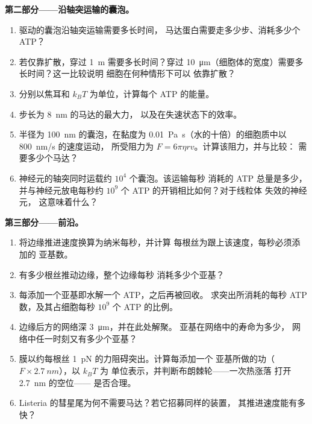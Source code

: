 \begin{problem}
\medskip
\noindent\textbf{第二部分——沿轴突运输的囊泡。}
\begin{enumerate}[resume]
  \item {}驱动的囊泡沿轴突运输需要多长时间，
        马达蛋白需要走多少步、消耗多少个 ATP？
  \item 若仅靠扩散，穿过 \qty{1}{m} 需要多长时间？穿过
        \qty{10}{\micro m}（细胞体的宽度）需要多长时间？这一比较说明
        细胞在何种情形下可以
        依靠扩散？
  \item 分别以焦耳和 $k_{B}T$ 为单位，计算每个 ATP 的能量。
  \item 步长为 \qty{8}{nm} 的马达的最大力，
        以及在失速状态下的效率。
  \item 半径为 \qty{100}{nm} 的囊泡，在黏度为
        \qty{0.01}{Pa.s}（水的十倍）的细胞质中以 \qty{800}{nm/s} 的速度运动，
        所受阻力为 $F = 6\pi\eta r v$。计算该阻力，并与比较：
        需要多少个马达？
  \item 神经元的轴突同时运载约 $10^{4}$ 个囊泡。该运输每秒
        消耗的 ATP 总量是多少，并与神经元放电每秒约
        $10^{9}$ 个 ATP 的开销相比如何？对于线粒体
        失效的神经元，
        这意味着什么？
\end{enumerate}

\medskip
\noindent\textbf{第三部分——前沿。}
\begin{enumerate}[resume]
  \item 将边缘推进速度换算为纳米每秒，并计算
        每根丝为跟上该速度，每秒必须添加的
        亚基数。
  \item 有多少根丝推动边缘，整个边缘每秒
        消耗多少个亚基？
  \item 每添加一个亚基即水解一个 ATP，之后再被回收。
        求突出所消耗的每秒 ATP 数，及其占细胞每秒 $10^{9}$
        个 ATP 的比例。
  \item 边缘后方的网络深 \qty{3}{\micro m}，并在此处解聚。
        亚基在网络中的寿命为多少，
        网络中任一时刻又有多少个亚基？
  \item 膜以约每根丝 \qty{1}{pN} 的力阻碍突出。计算每添加一个
        亚基所做的功（$F\times \qty{2.7}{nm}$），以 $k_{B}T$ 为
        单位表示，并判断布朗棘轮——一次热涨落
        打开 \qty{2.7}{nm} 的空位——
        是否合理。
  \item Listeria 的彗星尾为何不需要马达？若它招募同样的装置，
        其推进速度能有多快？
\end{enumerate}


\end{problem}
